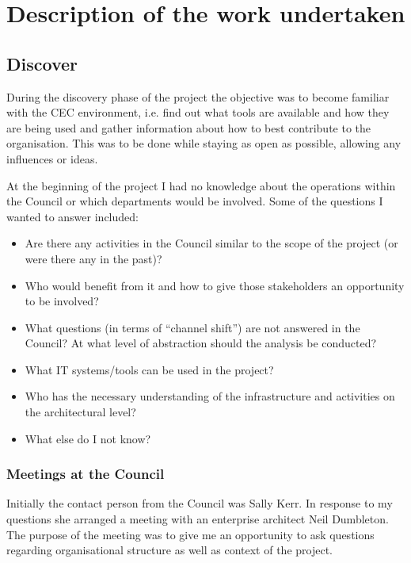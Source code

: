 
\chapter{Description of the work undertaken}
	\section{Discover}
	
During the discovery phase of the project the objective was to become familiar with the CEC environment, i.e. find out what tools are available and how they are being used and gather information about how to best contribute to the organisation. This was to be done while staying as open as possible, allowing any influences or ideas.

At the beginning of the project I had no knowledge about the operations within the Council or which departments would be involved. Some of the questions I wanted to answer included:
\begin{itemize}
\item Are there any activities in the Council similar to the scope of the project (or were there any in the past)?
\item Who would benefit from it and how to give those stakeholders an opportunity to be involved?
\item What questions (in terms of “channel shift”) are not answered in the Council?
At what level of abstraction should the analysis be conducted?
\item What IT systems/tools can be used in the project?
\item Who has the necessary understanding of the infrastructure and activities on the architectural level?
\item What else do I not know?
\end{itemize}

		\subsection{Meetings at the Council}
		
Initially the contact person from the Council was Sally Kerr. In response to my questions she arranged a meeting with an enterprise architect Neil Dumbleton. The purpose of the meeting was to give me an opportunity to ask questions regarding organisational structure as well as context of the project.

